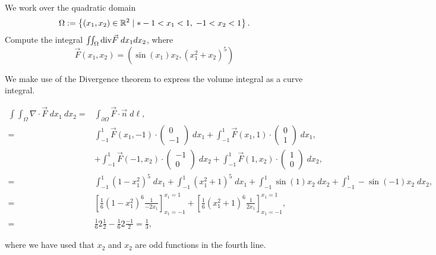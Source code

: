 \documentclass[11pt]{article}
\begin{document}






\begin{exercise}
    We work over the quadratic domain 
    \[
        \Omega := \left\{ (x_1,x_2) \in \bbR^{2} \suchthat* -1 < x_1 < 1, \; -1 < x_2 < 1 \right\}.
    \]
    Compute the integral $\iint_\Omega \mathrm{div} \vec F \;dx_1dx_2$, where 
    \[
        \vec F(x_1,x_2) = \left( \sin(x_1) x_2, \left( x_1^2 + x_2 \right)^5 \right)
    \]
\end{exercise}
\begin{solution}
 We make use of the Divergence theorem to express the volume integral as a curve integral.

\begin{align*}
\int \int_{\Omega} \nabla \cdot \vec{F} \;d x_1 \:d x_2 =&\int_{\partial \Omega}\vec{F}\cdot\vec{n} \;d\ell,\\
=&\int_{-1}^1 \vec{F}(x_1,-1)\cdot\begin{pmatrix}0\\-1\end{pmatrix} \;dx_1 + \int_{-1}^1 \vec{F}(x_1,1)\cdot\begin{pmatrix}0\\1\end{pmatrix} \;dx_1,\\
& + \int_{-1}^1 \vec{F}(-1,x_2)\cdot\begin{pmatrix}-1\\0\end{pmatrix} \;dx_2 + \int_{-1}^1 \vec{F}(1,x_2)\cdot\begin{pmatrix}1\\0\end{pmatrix} \;dx_2,\\
=&\int_{-1}^1 (1-x_1^ 2)^ 5 \;dx_1 + \int_{-1}^1 (x_1^2 + 1)^ 5 \;dx_1 + \int_{-1}^1 \sin(1)x_2\;dx_2 +  \int_{-1}^1 -\sin(-1)x_2\;dx_2,\\
=&  \left[\frac{1}{6}(1-x_1^ 2)^ 6 \frac{1}{-2x_1} \right]_{x_1 = -1}^{x_1 = 1} + \left[\frac{1}{6}(x_1^ 2 + 1)^ 6 \frac{1}{2x_1} \right]_{x_1 = -1}^{x_1 = 1},\\
=& \frac{1}{6} 2 \frac{1}{2} - \frac{1}{6} 2 \frac{-1}{2} = \frac{1}{3},
\end{align*}

where we have used that $x_2$ and $x_2$ are odd functions in the fourth line. 
\end{solution}
\end{document}
